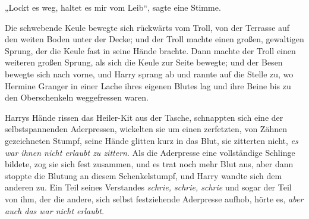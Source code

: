 „Lockt es weg, haltet es mir vom Leib“, sagte eine Stimme.

Die schwebende Keule bewegte sich rückwärts vom Troll, von der Terrasse auf den weiten Boden unter der Decke; und der Troll machte einen großen, gewaltigen Sprung, der die Keule fast in seine Hände brachte. Dann machte der Troll einen weiteren großen Sprung, als sich die Keule zur Seite bewegte; und der Besen bewegte sich nach vorne, und Harry sprang ab und rannte auf die Stelle zu, wo Hermine Granger in einer Lache ihres eigenen Blutes lag und ihre Beine bis zu den Oberschenkeln weggefressen waren.

Harrys Hände rissen das Heiler-Kit aus der Tasche, schnappten sich eine der selbstspannenden Aderpressen, wickelten sie um einen zerfetzten, von Zähnen gezeichneten Stumpf, seine Hände glitten kurz in das Blut, sie zitterten nicht, \emph{es war ihnen nicht erlaubt zu zittern}. Als die Aderpresse eine vollständige Schlinge bildete, zog sie sich fest zusammen, und es trat noch mehr Blut aus, aber dann stoppte die Blutung an diesem Schenkelstumpf, und Harry wandte sich dem anderen zu. Ein Teil seines Verstandes \emph{schrie, schrie, schrie} und sogar der Teil von ihm, der die andere, sich selbst festziehende Aderpresse aufhob, hörte es, \emph{aber auch das war nicht erlaubt.}

